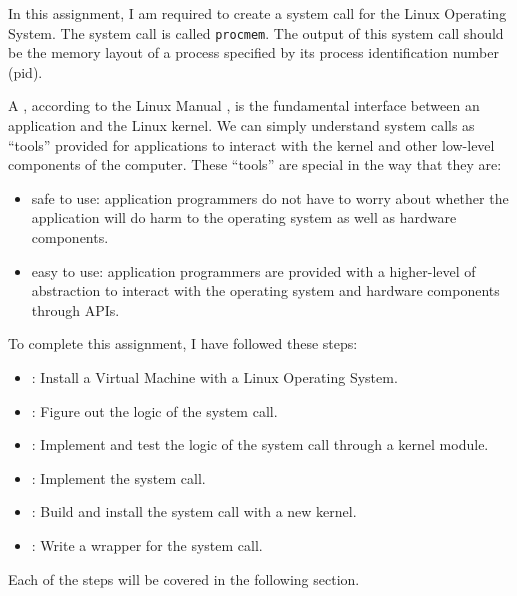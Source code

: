 

\par In this assignment, I am required to create a system call for the Linux Operating System. The system call is called \lstinline{procmem}. The output of this system call should be the memory layout of a process specified by its process identification number (pid).

\par A , according to the Linux Manual \cite{manpagesyscall}, is the fundamental interface between an application and the Linux kernel. We can simply understand system calls as ``tools'' provided for applications to interact with the kernel and other low-level components of the computer. These ``tools'' are special in the way that they are:

\begin{itemize}
  \item safe to use: application programmers do not have to worry about whether the application will do harm to the operating system as well as hardware components.
  \item easy to use: application programmers are provided with a higher-level of abstraction to interact with the operating system and hardware components through APIs.
\end{itemize}



\par To complete this assignment, I have followed these steps:
  \begin{itemize}
    \item {}: Install a Virtual Machine with a Linux Operating System.
    \item {}: Figure out the logic of the system call.
    \item {}: Implement and test the logic of the system call through a kernel module.
    \item {}: Implement the system call.
    \item {}: Build and install the system call with a new kernel.
    \item {}: Write a wrapper for the system call.
  \end{itemize}

\par Each of the steps will be covered in the following section.

